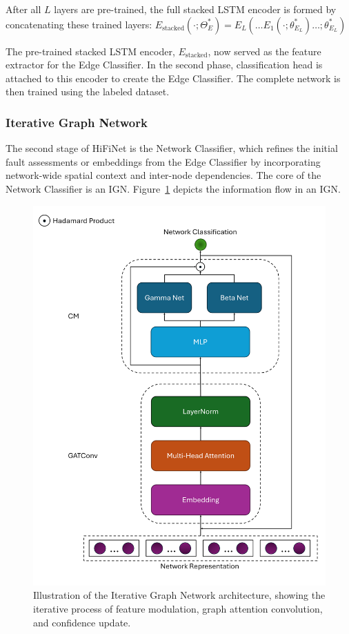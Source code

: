 After all \(L\) layers are pre-trained, the full stacked LSTM encoder is formed by concatenating these trained layers: \(E_\text{stacked}(\cdot; \Theta^*_{E}) = E_L(\ldots E_1(\cdot; \theta^*_{E_L}) \ldots;\theta^*_{E_L})\)

The pre-trained stacked LSTM encoder, \(E_\text{stacked}\), now served as the feature extractor for the Edge Classifier. In the second phase, classification head is attached to this encoder to create the Edge Classifier. The complete network is then trained using the labeled dataset.

\subsubsection{Iterative Graph Network}
The second stage of HiFiNet is the Network Classifier, which refines the initial fault assessments or embeddings from the Edge Classifier by incorporating network-wide spatial context and inter-node dependencies. The core of the Network Classifier is an IGN. Figure~\ref{fig:ign} depicts the information flow in an IGN.

\begin{figure}
  \centering
  \includegraphics[width=0.8\linewidth]{images/IGN.png}
  \caption{Illustration of the Iterative Graph Network architecture, showing the iterative process of feature modulation, graph attention convolution, and confidence update.}
  \label{fig:ign}
\end{figure}

